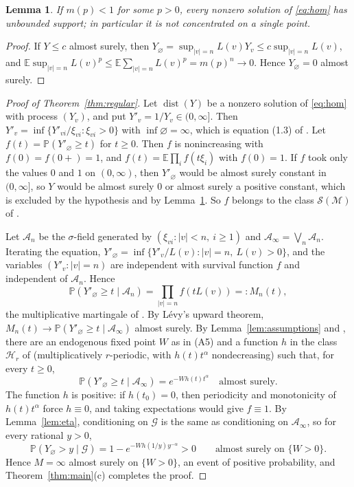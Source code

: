 \documentclass[11pt]{amsart}
\newtheorem{lemma}[theorem]{Lemma}
\theoremstyle{remark}
\newcommand{\Ga}{\mathcal{G}}
\newcommand{\cA}{\mathcal{A}}
\newcommand{\Pb}{\mathbb{P}}
\newcommand{\E}{\mathbb{E}}
\newcommand{\dist}{\operatorname{dist}}
\begin{document}
\begin{lemma}\label{lem:unbounded}
If $m(p)<1$ for some $p>0$, every nonzero solution of \eqref{eq:hom} has unbounded
support; in particular it is not concentrated on a single point.
\end{lemma}

\begin{proof}
If $Y\le c$ almost surely, then $Y_\varnothing=\sup_{|v|=n}L(v)Y_v\le c\sup_{|v|=n}L(v)$,
and $\E\sup_{|v|=n}L(v)^p\le\E\sum_{|v|=n}L(v)^p=m(p)^n\to0$. Hence $Y_\varnothing=0$
almost surely.
\end{proof}

\begin{proof}[Proof of Theorem~\ref{thm:regular}]
Let $\dist(Y)$ be a nonzero solution of \eqref{eq:hom} with process $(Y_v)$, and put
$Y'_v=1/Y_v\in(0,\infty]$. Then $Y'_v=\inf\{Y'_{vi}/\xi_{vi}:\xi_{vi}>0\}$ with
$\inf\varnothing=\infty$, which is equation (1.3) of \cite{ABM}. Let
$f(t)=\Pb(Y'_\varnothing\ge t)$ for $t\ge0$. Then $f$ is nonincreasing with
$f(0)=f(0+)=1$, and $f(t)=\E\prod_i f(t\xi_i)$ with $f(0)=1$. If $f$ took only the values
$0$ and $1$ on $(0,\infty)$, then $Y'_\varnothing$ would be almost surely constant in
$(0,\infty]$, so $Y$ would be almost surely $0$ or almost surely a positive constant,
which is excluded by the hypothesis and by Lemma~\ref{lem:unbounded}. So $f$ belongs to the
class $\mathcal{S}(\mathcal{M})$ of \cite{ABM}.

Let $\cA_n$ be the $\sigma$-field generated by $(\xi_{vi}:|v|<n,\ i\ge1)$ and
$\cA_\infty=\bigvee_n\cA_n$. Iterating the equation,
$Y'_\varnothing=\inf\{Y'_v/L(v):|v|=n,\ L(v)>0\}$, and the variables $(Y'_v:|v|=n)$ are
independent with survival function $f$ and independent of $\cA_n$. Hence
\[
\Pb(Y'_\varnothing\ge t\mid\cA_n)=\prod_{|v|=n}f(tL(v))=:M_n(t),
\]
the multiplicative martingale of \cite[Section~8]{ABM}. By L\'evy's upward theorem,
$M_n(t)\to\Pb(Y'_\varnothing\ge t\mid\cA_\infty)$ almost surely. By Lemma~\ref{lem:assumptions}
and \cite[Theorem~8.3]{ABM}, there are an endogenous fixed point $W$ as in (A5) and a
function $h$ in the class $\mathcal{H}_r$ of \cite{ABM} (multiplicatively $r$-periodic, with
$h(t)t^\alpha$ nondecreasing) such that, for every $t\ge 0$,
\[
\Pb(Y'_\varnothing\ge t\mid\cA_\infty)=e^{-W h(t)t^{\alpha}}\quad\text{almost surely.}
\]
The function $h$ is positive: if $h(t_0)=0$, then periodicity and monotonicity of
$h(t)t^\alpha$ force $h\equiv0$, and taking expectations would give $f\equiv1$. By
Lemma~\ref{lem:eta}, conditioning on $\Ga$ is the same as conditioning on $\cA_\infty$, so
for every rational $y>0$,
\[
\Pb(Y_\varnothing>y\mid\Ga)=1-e^{-W h(1/y)y^{-\alpha}}>0\qquad\text{almost surely on }\{W>0\}.
\]
Hence $M=\infty$ almost surely on $\{W>0\}$, an event of positive probability, and
Theorem~\ref{thm:main}(c) completes the proof.
\end{proof}
\end{document}
